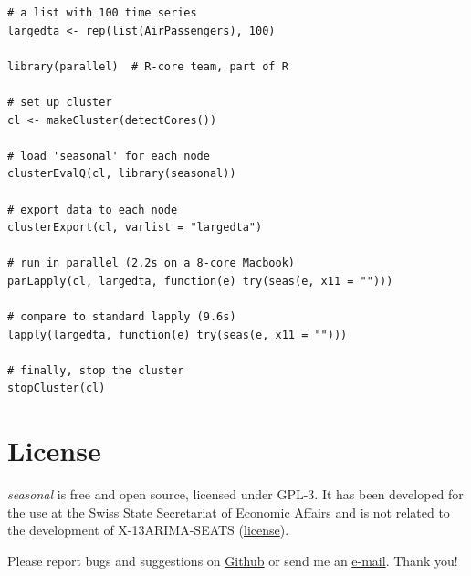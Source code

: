 \begin{verbatim}
# a list with 100 time series
largedta <- rep(list(AirPassengers), 100)

library(parallel)  # R-core team, part of R 

# set up cluster
cl <- makeCluster(detectCores())

# load 'seasonal' for each node
clusterEvalQ(cl, library(seasonal))

# export data to each node
clusterExport(cl, varlist = "largedta")

# run in parallel (2.2s on a 8-core Macbook)
parLapply(cl, largedta, function(e) try(seas(e, x11 = "")))

# compare to standard lapply (9.6s)
lapply(largedta, function(e) try(seas(e, x11 = "")))

# finally, stop the cluster
stopCluster(cl)
\end{verbatim}

\section{License}\label{license}

\emph{seasonal} is free and open source, licensed under GPL-3. It has
been developed for the use at the Swiss State Secretariat of Economic
Affairs and is not related to the development of X-13ARIMA-SEATS
(\href{https://www.census.gov/srd/www/disclaimer.html}{license}).

Please report bugs and suggestions on
\href{https://github.com/christophsax/seasonal}{Github} or send me an
\href{mailto:christoph.sax@gmail.com}{e-mail}. Thank you!
